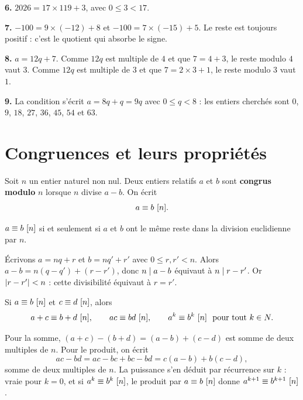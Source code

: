 \begin{corrige}
\textbf{6.} $2026 = 17\times119+3$, avec $0 \leq 3 < 17$.

\textbf{7.} $-100 = 9\times(-12)+8$ et $-100 = 7\times(-15)+5$. Le reste est
toujours positif : c'est le quotient qui absorbe le signe.

\textbf{8.} $a = 12q+7$. Comme $12q$ est multiple de $4$ et que $7 = 4+3$, le
reste modulo $4$ vaut $3$. Comme $12q$ est multiple de $3$ et que
$7 = 2\times3+1$, le reste modulo $3$ vaut $1$.

\textbf{9.} La condition s'écrit $a = 8q+q = 9q$ avec $0 \leq q < 8$ : les
entiers cherchés sont $0$, $9$, $18$, $27$, $36$, $45$, $54$ et $63$.
\end{corrige}

\section{Congruences et leurs propriétés}

\begin{definition}
Soit $n$ un entier naturel non nul. Deux entiers relatifs $a$ et $b$ sont
\textbf{congrus modulo} $n$ lorsque $n$ divise $a-b$. On écrit
\[
  a \equiv b \ [n] .
\]
\end{definition}

\begin{propriete}
$a \equiv b \ [n]$ si et seulement si $a$ et $b$ ont le même reste dans la
division euclidienne par $n$.
\end{propriete}

\begin{demonstration}
Écrivons $a = nq+r$ et $b = nq'+r'$ avec $0 \leq r,r' < n$. Alors
$a-b = n(q-q')+(r-r')$, donc $n \mid a-b$ équivaut à $n \mid r-r'$. Or
$\left|r-r'\right| < n$ : cette divisibilité équivaut à $r = r'$.
\end{demonstration}

\begin{propriete}
Si $a \equiv b \ [n]$ et $c \equiv d \ [n]$, alors
\[
  a+c \equiv b+d \ [n], \qquad ac \equiv bd \ [n], \qquad
  a^{k} \equiv b^{k} \ [n] \ \text{ pour tout } k \in N .
\]
\end{propriete}

\begin{demonstration}
Pour la somme, $(a+c)-(b+d) = (a-b)+(c-d)$ est somme de deux multiples de
$n$. Pour le produit, on écrit
\[
  ac-bd = ac-bc+bc-bd = c(a-b)+b(c-d),
\]
somme de deux multiples de $n$. La puissance s'en déduit par récurrence sur
$k$ : vraie pour $k = 0$, et si $a^{k} \equiv b^{k} \ [n]$, le produit par
$a \equiv b \ [n]$ donne $a^{k+1} \equiv b^{k+1} \ [n]$.
\end{demonstration}

